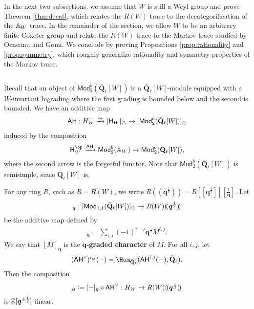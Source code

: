 \documentclass[a4paper,10pt,leqno]{amsart}
\theoremstyle{plain}
\theoremstyle{plain}
\theoremstyle{plain}
\theoremstyle{definition}
\theoremstyle{remark}
\newcommand{\dfemph}[1]{\textbf{#1}}
\newcommand{\Mod}{\mathsf{Mod}}
\newcommand{\Q}{\bm{q}}
\newcommand{\QL}{\bar{\mathbf{Q}}_\ell}
\begin{document}
In the next two subsections, we assume that $W$ is still a Weyl group and prove Theorem \ref{thm:decat}, which relates the $R(W)$ trace to the decategorification of the $\mathbb{A}_W$ trace.
In the remainder of the section, we allow $W$ to be an arbitrary finite Coxeter group and relate the $R(W)$ trace to the Markov trace studied by Ocneanu and Gomi.
We conclude by proving Propositions \ref{prop:rationality} and \ref{prop:symmetry}, which roughly generalize rationality and symmetry properties of the Markov trace.

\subsection{}

Recall that an object of $\Mod_2^b(\QL[W])$ is a $\QL[W]$-module equipped with a $W$-invariant bigrading where the first grading is bounded below and the second is bounded.
We have an additive map
\begin{align}
\sf{AH} : H_W \xrightarrow{\sim} [\sf{H}_W]_\triangle \to [\Mod_2^b(\QL[W])]_\oplus
\end{align}
induced by the composition
\begin{align}
\sf{H}_W^\op \xrightarrow{\sf{AH}} \Mod_2^b(\bb{A}_W) \to \Mod_2^b(\QL[W]),
\end{align}
where the second arrow is the forgetful functor.
Note that $\Mod_2^b(\QL[W])$ is semisimple, since $\QL[W]$ is.

For any ring $R$, such as $R = R(W)$, we write $R(\!(\Q^{\frac{1}{2}})\!) = R[\![\Q^{\frac{1}{2}}]\!][\frac{1}{\Q}]$.
Let
\begin{align}
[-]_{\Q} : [\sf{Mod}_{1, 1}(\QL[W])]_\oplus \to R(W)(\!(\Q^{\frac{1}{2}})\!)
\end{align}
be the additive map defined by
\begin{align}
[M]_{\Q} = \sum_{i, j}
{(-1)^{i - j}} \Q^{\frac{j}{2}} M^{i, j}.
\end{align}
We say that $[M]_{\Q}$ is the \dfemph{$\Q$-graded character} of $M$.
For all $i, j$, let 
\begin{align}
(\sf{AH}^\vee)^{i, j}(-) = \Hom_{\QL}(\sf{AH}^{i, j}(-), \QL).
\end{align}
Then the composition
\begin{align}
[\sf{AH}^\vee]_{\Q} \vcentcolon= [-]_{\Q} \circ \sf{AH}^\vee
	: H_W \to R(W)(\!(\Q^{\frac{1}{2}})\!)
\end{align}
is $\bb{Z}[\Q^{\pm\frac{1}{2}}]$-linear.

\subsection{}
\end{document}

